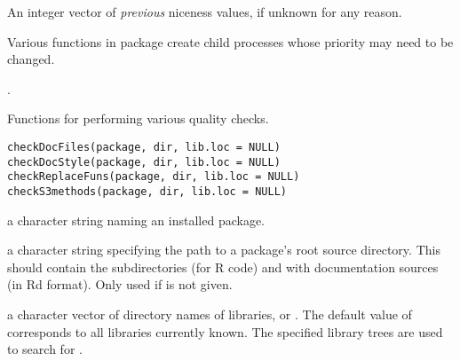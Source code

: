 %
\begin{Value}
An integer vector of \emph{previous} niceness values,
 if unknown for any reason.
\end{Value}
%
\begin{SeeAlso}\relax
Various functions in package  create child processes
whose priority may need to be changed.

.
\end{SeeAlso}
%
\begin{Description}\relax
Functions for performing various quality checks.
\end{Description}
%
\begin{Usage}
\begin{verbatim}
checkDocFiles(package, dir, lib.loc = NULL)
checkDocStyle(package, dir, lib.loc = NULL)
checkReplaceFuns(package, dir, lib.loc = NULL)
checkS3methods(package, dir, lib.loc = NULL)
\end{verbatim}
\end{Usage}
%
\begin{Arguments}
\begin{ldescription}
\item[\code{package}] a character string naming an installed package.
\item[\code{dir}] a character string specifying the path to a package's root
source directory.  This should contain the subdirectories 
(for R code) and  with \R{} documentation sources (in Rd
format).  Only used if  is not given.
\item[\code{lib.loc}] a character vector of directory names of \R{} libraries,
or .  The default value of  corresponds to all
libraries currently known.  The specified library trees are used to
search for .
\end{ldescription}
\end{Arguments}
%
